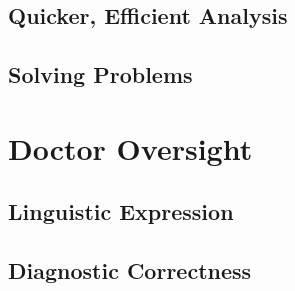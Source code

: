 \documentclass[11pt]{article}
\newcommand{\tab}{\hspace*{2em}}
\begin{document}
\begin{doublespace}
\subsection{Quicker, Efficient Analysis}

\tab 

\subsection{Solving Problems}

\tab 

\section{Doctor Oversight}

\tab 

\subsection{Linguistic Expression}

\tab 

\subsection{Diagnostic Correctness}

\tab 


\end{doublespace}

\nocite{*}



\end{document}
